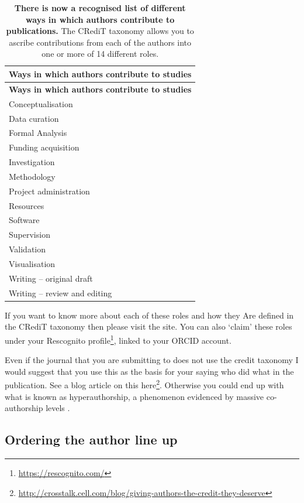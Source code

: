 \documentclass[
]{krantz}
\renewcommand{\href}[2]{#2\footnote{\url{#1}}}
\begin{document}
\begin{longtable}[]{@{}l@{}}
\caption{\label{tab:CRediT} \textbf{There is now a recognised list of different ways in which authors contribute to publications.} The CRediT taxonomy allows you to ascribe contributions from each of the authors into one or more of 14 different roles.}\tabularnewline
\toprule
\textbf{Ways in which authors contribute to studies} \\
\midrule
\endfirsthead
\toprule
\textbf{Ways in which authors contribute to studies} \\
\midrule
\endhead
Conceptualisation \\
Data curation \\
Formal Analysis \\
Funding acquisition \\
Investigation \\
Methodology \\
Project administration \\
Resources \\
Software \\
Supervision \\
Validation \\
Visualisation \\
Writing -- original draft \\
Writing -- review and editing \\
\bottomrule
\end{longtable}

If you want to know more about each of these roles and how they Are defined in the CRediT taxonomy then please visit the site. You can also `claim' these roles under your \href{https://rescognito.com/}{Rescognito profile}, linked to your ORCID account.

Even if the journal that you are submitting to does not use the credit taxonomy I would suggest that you use this as the basis for your saying who did what in the publication. See a blog article on this \href{http://crosstalk.cell.com/blog/giving-authors-the-credit-they-deserve}{here}. Otherwise you could end up with what is known as hyperauthorship, a phenomenon evidenced by massive co-authorship levels \citep{cronin2001hyperauthorship}.

\hypertarget{ordering-the-author-line-up}{%
\subsection{Ordering the author line up}\label{ordering-the-author-line-up}}
\end{document}
